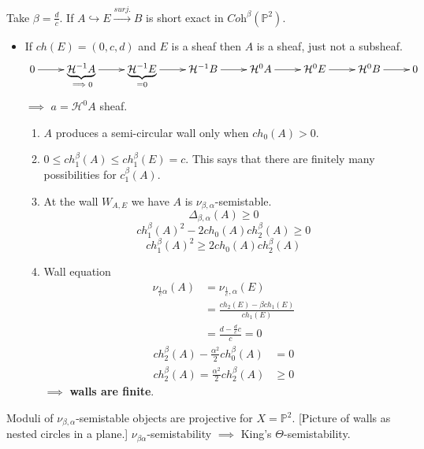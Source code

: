 \medskip\noindent
Take $\beta=\frac{d}{c}$. If $A \hookrightarrow E  \xrightarrow{surj.} B$ is 
short exact in $\textit{Coh}^\beta(\mathbb{P}^2)$. 
\begin{itemize}
\item If $ch(E)=(0,c,d)$ and $E$ is
a sheaf then $A$ is a sheaf, just not a subsheaf.
$$
\xymatrix{
0\ar[r]&\underbrace{\mathcal{H}^{-1}A}_{\implies 0}\ar[r]
&  \underbrace{\mathcal{H}^{-1}E}_{=0}\ar[r]
&  \mathcal{H}^{-1}B\ar[r]
&  \mathcal{H}^0A\ar[r]&  \mathcal{H}^0E\ar[r] &  \mathcal{H}^0B\ar[r]&0
}
$$
$\implies$ $a= \mathcal{H}^0A$ sheaf.
\begin{enumerate}
\item $A$ produces a semi-circular wall only when $ch_0(A)>0$.
\item $0 \leq  ch_1^\beta(A) \leq ch_1^\beta(E)=c$. 
This says that there are finitely many possibilities for $c_1^\beta(A)$.
\item At the wall $W_{A,E}$ we have $A$ is $\nu_{\beta,\alpha}$-semistable.
$$
\Delta_{\beta,\alpha}(A)\geq 0
$$
$$
ch_1^\beta(A)^2-2ch_0(A)ch_2^\beta(A)\geq 0
$$
$$
ch_1^\beta(A)^2\geq 2ch_0(A)ch_2^\beta(A)
$$
\item Wall equation
\begin{align*}
\nu_{\frac{1}{c}\alpha}(A)&=\nu_{\frac{1}{c},\alpha}(E)\\
&=\frac{ch_2(E)-\beta ch_1(E)}{ch_1(E)}\\
&=\frac{d-\frac{d}{c}c}{c}=0
\end{align*}
\begin{align*}
ch_2^\beta(A)-\frac{\alpha^2}{2}ch_0^\beta(A)&=0\\
ch_2^\beta(A)=\frac{\alpha^2}{2}ch_2^\beta(A)& \geq 0
\end{align*}
$\implies$ {\bf walls are finite}.
\end{enumerate}
\end{itemize}

\medskip\noindent
Moduli of $\nu_{\beta,\alpha}$-semistable objects are projective for
$X=\mathbb{P}^2$. [Picture of walls as nested circles in a plane.] 
$\nu_{\beta \alpha}$-semistability $\implies$ King's $\Theta$-semistability.

